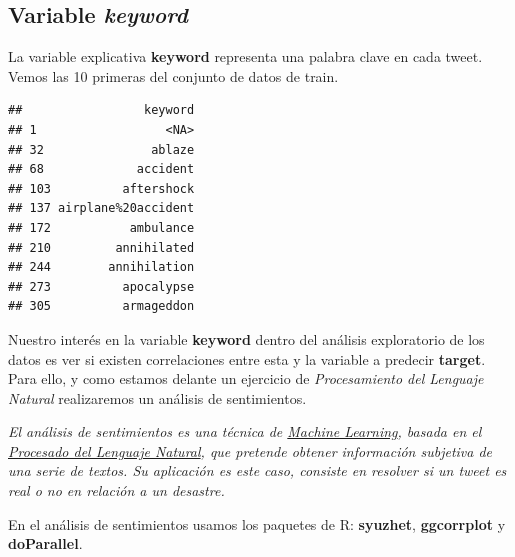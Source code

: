 \documentclass[]{article}
\newenvironment{Shaded}{\begin{snugshade}}{\end{snugshade}}
\newcommand{\DecValTok}[1]{\textcolor[rgb]{0.00,0.00,0.81}{#1}}
\newcommand{\KeywordTok}[1]{\textcolor[rgb]{0.13,0.29,0.53}{\textbf{#1}}}
\newcommand{\NormalTok}[1]{#1}
\newcommand{\OperatorTok}[1]{\textcolor[rgb]{0.81,0.36,0.00}{\textbf{#1}}}
\newcommand{\StringTok}[1]{\textcolor[rgb]{0.31,0.60,0.02}{#1}}
\begin{document}
\hypertarget{variable-keyword}{%
\subsection{\texorpdfstring{Variable
\emph{keyword}}{Variable keyword}}\label{variable-keyword}}

La variable explicativa \textbf{keyword} representa una palabra clave en
cada tweet. Vemos las 10 primeras del conjunto de datos de train.

\begin{Shaded}
\end{Shaded}

\begin{verbatim}
##                 keyword
## 1                  <NA>
## 32               ablaze
## 68             accident
## 103          aftershock
## 137 airplane%20accident
## 172           ambulance
## 210         annihilated
## 244        annihilation
## 273          apocalypse
## 305          armageddon
\end{verbatim}

Nuestro interés en la variable \textbf{keyword} dentro del análisis
exploratorio de los datos es ver si existen correlaciones entre esta y
la variable a predecir \textbf{target}. Para ello, y como estamos
delante un ejercicio de \emph{Procesamiento del Lenguaje Natural}
realizaremos un análisis de sentimientos.

\emph{El análisis de sentimientos es una técnica de
\href{https://en.wikipedia.org/wiki/Machine_learning}{Machine Learning},
basada en el
\href{https://www.kdnuggets.com/2017/02/natural-language-processing-key-terms-explained.html}{Procesado
del Lenguaje Natural}, que pretende obtener información subjetiva de una
serie de textos. Su aplicación es este caso, consiste en resolver si un
tweet es real o no en relación a un desastre.}

En el análisis de sentimientos usamos los paquetes de R:
\textbf{syuzhet}, \textbf{ggcorrplot} y \textbf{doParallel}.
\end{document}
